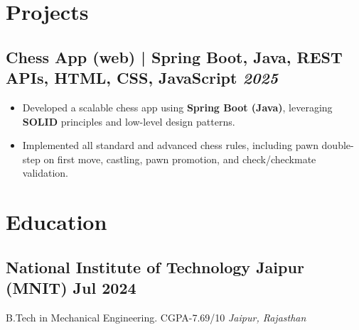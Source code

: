 \documentclass[a4paper,10pt]{article}
\newcommand{\subtext}[1]{
#1\par\vspace{-0.2cm}}
\newenvironment{zitemize}{
\begin{itemize}\itemsep0pt \parskip0pt \parsep1pt}
{\end{itemize}\vspace{-0.7cm}}
\begin{document}
\section{Projects}



\subsection*{{Chess App (web) | {Spring Boot, Java, REST APIs, HTML, CSS, JavaScript}} \hfill {\small\textit{2025}}}

\begin{zitemize}
\item Developed a scalable chess app using \textbf{Spring Boot (Java)}, leveraging \textbf{SOLID} principles and low-level design patterns.
\item Implemented all standard and advanced chess rules, including pawn double-step on first move, castling, pawn promotion, and check/checkmate validation.


\end{zitemize}
\vspace{0.0cm}

\section{Education}
\subsection*{National Institute of Technology Jaipur (MNIT) \hfill Jul 2024} 
\subtext{B.Tech in Mechanical Engineering.  CGPA-7.69/10 \hfill \textit{Jaipur, Rajasthan}}
\vspace{-0.1cm}


\end{document}
